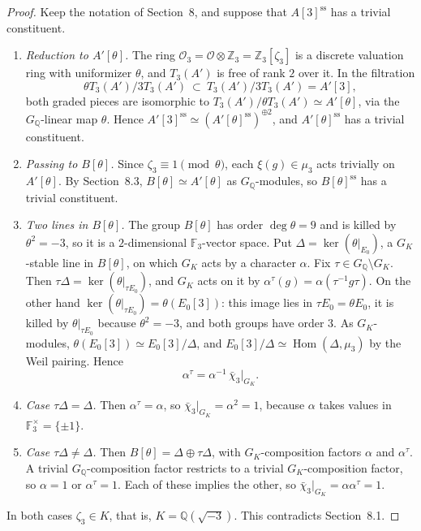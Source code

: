\documentclass[11pt]{article}
\newcommand{\Q}{\mathbb Q}
\newcommand{\Z}{\mathbb Z}
\newcommand{\F}{\mathbb F}
\DeclareMathOperator{\Hom}{Hom}
\begin{document}
\begin{proof}
Keep the notation of Section~8, and suppose that \(A[3]^{\mathrm{ss}}\)
has a trivial constituent.
\begin{enumerate}
\item \emph{Reduction to \(A'[\theta]\).} The ring
\(\mathcal O_3=\mathcal O\otimes\Z_3=\Z_3[\zeta_3]\) is a discrete
valuation ring with uniformizer \(\theta\), and \(T_3(A')\) is free of
rank \(2\) over it. In the filtration
\[
\theta T_3(A')/3T_3(A')\ \subset\ T_3(A')/3T_3(A')=A'[3],
\]
both graded pieces are isomorphic to
\(T_3(A')/\theta T_3(A')\simeq A'[\theta]\), via the \(G_{\Q}\)-linear
map \(\theta\). Hence
\(A'[3]^{\mathrm{ss}}\simeq(A'[\theta]^{\mathrm{ss}})^{\oplus2}\), and
\(A'[\theta]^{\mathrm{ss}}\) has a trivial constituent.
\item \emph{Passing to \(B[\theta]\).} Since
\(\zeta_3\equiv1\pmod{\theta}\), each \(\xi(g)\in\mu_3\) acts trivially
on \(A'[\theta]\). By Section~8.3, \(B[\theta]\simeq A'[\theta]\) as
\(G_{\Q}\)-modules, so \(B[\theta]^{\mathrm{ss}}\) has a trivial
constituent.
\item \emph{Two lines in \(B[\theta]\).} The group \(B[\theta]\) has
order \(\deg\theta=9\) and is killed by \(\theta^2=-3\), so it is a
\(2\)-dimensional \(\F_3\)-vector space. Put
\(\Delta=\ker(\theta|_{E_0})\), a \(G_K\)-stable line in \(B[\theta]\),
on which \(G_K\) acts by a character \(\alpha\). Fix
\(\tau\in G_{\Q}\setminus G_K\). Then
\(\tau\Delta=\ker(\theta|_{\tau E_0})\), and \(G_K\) acts on it by
\(\alpha^\tau(g)=\alpha(\tau^{-1}g\tau)\). On the other hand
\(\ker(\theta|_{\tau E_0})=\theta(E_0[3])\): this image lies in
\(\tau E_0=\theta E_0\), it is killed by \(\theta|_{\tau E_0}\) because
\(\theta^2=-3\), and both groups have order \(3\). As \(G_K\)-modules,
\(\theta(E_0[3])\simeq E_0[3]/\Delta\), and
\(E_0[3]/\Delta\simeq\Hom(\Delta,\mu_3)\) by the Weil pairing. Hence
\[
\alpha^\tau=\alpha^{-1}\,\bar\chi_3|_{G_K}.
\]
\item \emph{Case \(\tau\Delta=\Delta\).} Then \(\alpha^\tau=\alpha\),
so \(\bar\chi_3|_{G_K}=\alpha^2=1\), because \(\alpha\) takes values in
\(\F_3^\times=\{\pm1\}\).
\item \emph{Case \(\tau\Delta\ne\Delta\).} Then
\(B[\theta]=\Delta\oplus\tau\Delta\), with \(G_K\)-composition factors
\(\alpha\) and \(\alpha^\tau\). A trivial \(G_{\Q}\)-composition factor
restricts to a trivial \(G_K\)-composition factor, so \(\alpha=1\) or
\(\alpha^\tau=1\). Each of these implies the other, so
\(\bar\chi_3|_{G_K}=\alpha\alpha^\tau=1\).
\end{enumerate}
In both cases \(\zeta_3\in K\), that is, \(K=\Q(\sqrt{-3})\). This
contradicts Section~8.1.
\end{proof}
\end{document}
